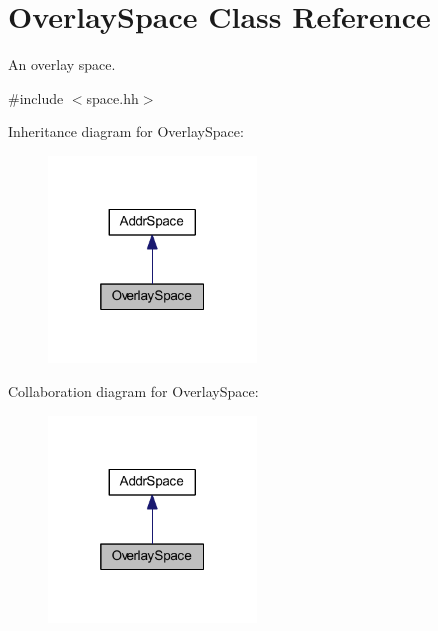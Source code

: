 \hypertarget{class_overlay_space}{}\section{Overlay\+Space Class Reference}
\label{class_overlay_space}


An overlay space.  




{\ttfamily \#include $<$space.\+hh$>$}



Inheritance diagram for Overlay\+Space\+:
\nopagebreak
\begin{figure}[H]
\begin{center}
\leavevmode
\includegraphics[width=157pt]{class_overlay_space__inherit__graph}
\end{center}
\end{figure}


Collaboration diagram for Overlay\+Space\+:
\nopagebreak
\begin{figure}[H]
\begin{center}
\leavevmode
\includegraphics[width=157pt]{class_overlay_space__coll__graph}
\end{center}
\end{figure}
